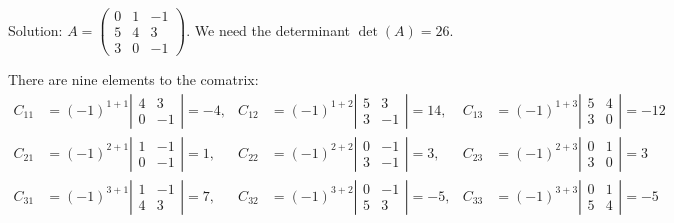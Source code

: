 \documentclass[usenames,dvipsnames,aspectratio=169,10pt]{beamer}
\numberwithin{equation}{section}
\begin{document}
\begin{frame}

Solution: 
$A = 
\begin{pmatrix}
  0 & 1 & -1 \\
  5 & 4 &  3 \\
  3 & 0 & -1
\end{pmatrix}$.
We need the determinant $\det(A)=26$.

There are nine elements to the comatrix:
\begin{align*}
C_{11} &= (-1)^{1+1}\left|\begin{matrix} 4 & 3 \\ 0 & -1 \end{matrix}\right|=-4, & 
C_{12} &= (-1)^{1+2}\left|\begin{matrix} 5 & 3 \\ 3 & -1 \end{matrix}\right|=14, & 
C_{13} &= (-1)^{1+3}\left|\begin{matrix} 5 & 4 \\ 3 & 0 \end{matrix}\right|=-12 \\
C_{21} &= (-1)^{2+1}\left|\begin{matrix} 1 & -1 \\ 0 & -1 \end{matrix}\right|=1,
&
C_{22} &= (-1)^{2+2}\left|\begin{matrix} 0 & -1 \\ 3 & -1 \end{matrix}\right|=3, &
C_{23} &= (-1)^{2+3}\left|\begin{matrix} 0 & 1 \\ 3 & 0 \end{matrix}\right|=3
\\
C_{31} &= (-1)^{3+1}\left|\begin{matrix} 1 & -1 \\ 4 & 3 \end{matrix}\right|=7,
&
C_{32} &= (-1)^{3+2}\left|\begin{matrix} 0 & -1 \\ 5 & 3 \end{matrix}\right|=-5, 
&
C_{33} &= (-1)^{3+3}\left|\begin{matrix} 0 & 1 \\ 5 & 4 \end{matrix}\right|=-5
\end{align*}

\end{frame}
\end{document}
